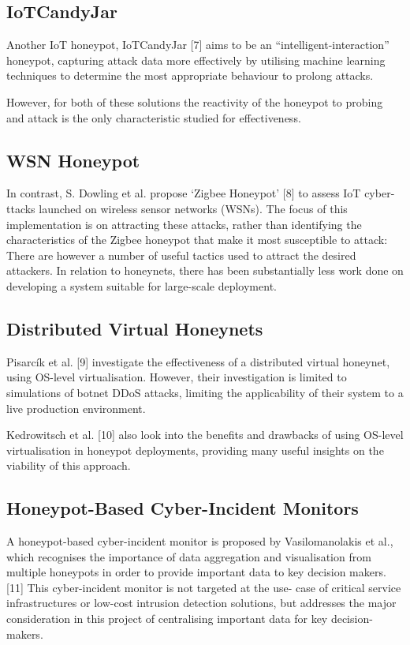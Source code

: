 	\subsection{IoTCandyJar}
	
	Another IoT honeypot, IoTCandyJar [7] aims to be an “intelligent-interaction” honeypot, capturing attack data more effectively by utilising machine learning techniques to determine the most appropriate behaviour to prolong attacks. 
	
	However, for both of these solutions the reactivity of the honeypot to probing and attack is the only characteristic studied for effectiveness. 
	
	\subsection{WSN Honeypot}
	
	In contrast, S. Dowling et al. propose ‘Zigbee Honeypot’ [8] to assess IoT cyber- ttacks launched on wireless sensor networks (WSNs). The focus of this implementation is on attracting these attacks, rather than  identifying the characteristics of the Zigbee honeypot that make it most susceptible to attack: There are however a number of useful tactics used to attract the desired attackers. In relation to honeynets, there has been substantially less work done on developing a system suitable for large-scale deployment. 
	
	\subsection{Distributed Virtual Honeynets}
	
	Pisarcík et al. [9] investigate the effectiveness of a distributed virtual honeynet, using OS-level virtualisation. However, their investigation is limited to simulations of botnet DDoS attacks, limiting the applicability of their system to a live production environment. 
	
	Kedrowitsch et al. [10] also look into the benefits and drawbacks of using OS-level virtualisation in honeypot deployments, providing many useful insights on the viability of this approach. 
	
	\subsection{Honeypot-Based Cyber-Incident Monitors}
	
	A honeypot-based cyber-incident monitor is proposed by Vasilomanolakis et al., which recognises the importance of data aggregation and visualisation from multiple honeypots in order to provide important data to key decision makers. [11] This cyber-incident monitor is not targeted at the use- case of critical service infrastructures or low-cost intrusion detection solutions, but addresses the major consideration in this project of centralising important data for key decision-makers. 
	
